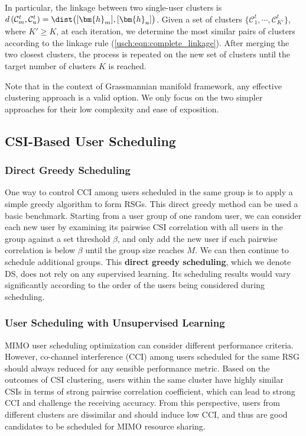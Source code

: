 In particular, the linkage between two single-user clusters is $d \left( \mathcal{C}_m^t,\mathcal{C}_u^t \right) =\dist \big( [\bm{h}_m],[\bm{h}_u] \big)$. Given a set of clusters $\{\mathcal{C}_1^t,\cdots, \mathcal{C}_{K'}^t\}$, where $K'\geq K$, at each iteration, we determine the most similar pairs of clusters according to the linkage rule (\ref{usch:eqn:complete_linkage}). 
After merging the two closest clusters, the process is repeated on the new set of clusters until the target number of clusters $K$ is reached.

Note that in the context of Grassmannian manifold framework, any
effective clustering approach is a valid option. 
We only focus on the two simpler approaches for their low complexity and ease of exposition. 






\subsection{CSI-Based User Scheduling} \label{usch:ssec:grouping}

\subsubsection{Direct Greedy Scheduling}
One way to control CCI among users scheduled in the same group is to apply a simple greedy algorithm to form RSGs. 
This direct greedy method can be used a basic benchmark. 
Starting from a user group of one random user, we can consider each new user by examining its pairwise CSI correlation with all users in the group against a set threshold $\beta$, and only add the new user if each pairwise correlation is below $\beta$ until the group size reaches $M$.  We can then continue to schedule additional groups. 
This \textbf{direct greedy scheduling}, which we denote DS, does not rely on any supervised learning. 
Its scheduling results would vary significantly according to the order of the users being considered during scheduling. 


\subsubsection{User Scheduling with Unsupervised Learning}
MIMO user scheduling optimization can consider different performance criteria.
However, co-channel interference (CCI) among users scheduled for the same RSG should always reduced for any sensible performance metric. 
Based on the outcomes of CSI clustering, users within the same cluster have highly similar CSIs in terms of strong pairwise correlation coefficient, which can lead to strong CCI and challenge the receiving accuracy. 
From this perspective, users from different clusters are dissimilar and should induce low CCI, and thus are good candidates to be scheduled for MIMO resource sharing.

